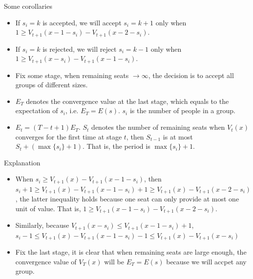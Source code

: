     \begin{frame}{Some corollaries}
      \begin{itemize}
        \justifying
        \item If $s_i=k$ is accepted, we will accept $s_i=k+1$ only when $1 \geq V_{t+1}(x-1-s_i) - V_{t+1}(x-2-s_i)$.
        \item If $s_i=k$ is rejected, we will reject $s_i=k-1$ only when $1 \geq V_{t+1}(x-s_i)- V_{t+1}(x-1-s_i)$.
        \vspace{10pt}
        \item Fix some stage, when remaining seats $\to \infty$, the decision is to accept all groups of different sizes.
        \vspace{10pt}
        \item $E_T$ denotes the convergence value at the last stage, which equals to the expectation of $s_i$, i.e. $E_T = E(s)$. $s_i$ is the number of people in a group.
        \vspace{10pt}
        \item $E_t = (T-t+1) E_T$. $S_t$ denotes the number of remaining seats when $V_t(x)$ converges for the first time at stage $t$, then $S_{t-1}$ is at most $S_t + (\max\{s_i\}+1)$. That is, the period is $\max\{s_i\}+1$.
      \end{itemize}
    \end{frame}

    \begin{frame}{Explanation}
      \begin{itemize}
        \item When $s_i \geq V_{t+1}(x) - V_{t+1}(x-1-s_i)$, then $s_i+1 \geq V_{t+1}(x) - V_{t+1}(x-1-s_i)+1 \geq V_{t+1}(x) - V_{t+1}(x-2-s_i)$, the latter inequality holds because one seat can only provide at most one unit of value. That is,
        $1 \geq V_{t+1}(x-1-s_i) - V_{t+1}(x-2-s_i)$.
        \vspace{10pt}
        \item Similarly, because $V_{t+1}(x-s_i) \leq  V_{t+1}(x-1-s_i)+1$, $s_i-1 \leq V_{t+1}(x) - V_{t+1}(x-1-s_i)-1 \leq V_{t+1}(x) - V_{t+1}(x-s_i)$
        \vspace{10pt}
        \item Fix the last stage, it is clear that when remaining seats are large enough, the convergence value of $V_T(x)$ will be $E_T = E(s)$ because we will accpet any group.
      \end{itemize}
    \end{frame}

